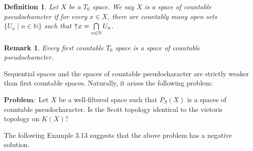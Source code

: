 \documentclass[preprint,12pt]{elsarticle}
\numberwithin{equation}{section}
\newtheorem{definition}[theorem]{Definition}
\newtheorem{remark}[theorem]{Remark}
\newcommand{\up}{\mathord{\uparrow}\hspace{0.05em}}
\begin{document}
\begin{definition}{\rm Let $X$ be a $T_{0}$ space. We say $X$ is a space of countable pseudocharacter if for every $x\in X$, there are countably many open sets $\{U_{n}\mid n\in\mathbb{N}\}$ such that $\up x=\bigcap\limits_{n\in\mathbb{N}}U_{n}$.}
\end{definition}

\begin{remark} {\rm Every first countable $T_{0}$ space is a space of countable pseudocharacter.}

\end{remark}

Sequential spaces and the spaces of countable pseudocharacter are strictly weaker than first countable spaces. Naturally, it arises the following problem:

\vspace*{0.2cm}
$\mathbf{Problem:}$ Let $X$ be a well-filtered space such that $P_{S}(X)$ is a spaces of countable pseudocharacter. Is the Scott topology identical to the vietoris topology on $K(X)$?
\vspace*{0.2cm}

The following Example 3.13 suggests that the above problem has a negative solution.
\end{document}
